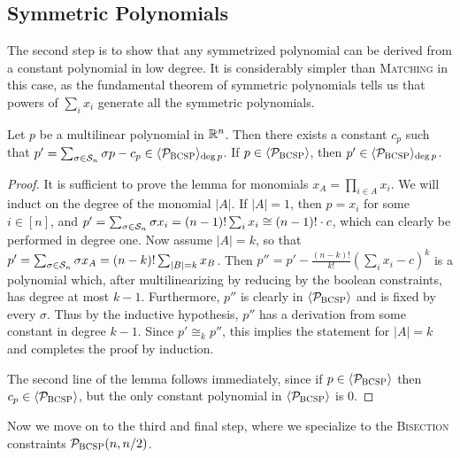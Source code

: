 \subsection{Symmetric Polynomials}
The second step is to show that any symmetrized polynomial can be derived from a constant polynomial in low degree. It is considerably simpler than \textsc{Matching} in this case, as the fundamental theorem of symmetric polynomials tells us that powers of $\sum_i x_i$ generate all the symmetric polynomials. 
\begin{lemma}\label{lem:bcsp-symmetric}
Let $p$ be a multilinear polynomial in $\mathbb R^n$. Then there exists a constant $c_p$ such that $p' = \sum_{\sigma \in \mathcal S_n} \sigma p - c_p \in \langle \mathcal P_{\textsc{BCSP}} \rangle_{\deg p}$. If $p \in \langle \mathcal P_{\textsc{BCSP}} \rangle$, then $p' \in \langle \mathcal P_{\textsc{BCSP}} \rangle_{\deg p}$.
\end{lemma}
\begin{proof}
It is sufficient to prove the lemma for monomials $x_A = \prod_{i \in A} x_i$. We will induct on the degree of the monomial $|A|$. 
If $|A| = 1$, then $p = x_i$ for some $i \in [n]$, and $p' = \sum_{\sigma \in \mathcal S_n} \sigma x_i = (n-1)!\sum_i x_i \cong (n-1)!\cdot c$, which can clearly be performed in degree one. Now assume $|A| = k$, so that $p' = \sum_{\sigma \in \mathcal S_n} \sigma x_A = (n-k)! \sum_{|B|=k} x_B$. Then $p'' = p' - \frac{(n-k)!}{k!}\left(\sum_i x_i - c\right)^k$ is a polynomial which, after multilinearizing by reducing by the boolean constraints, has degree at most $k-1$. Furthermore, $p''$ is clearly in $\langle \mathcal P_{\textsc{BCSP}} \rangle$ and is fixed by every $\sigma$. Thus by the inductive hypothesis, $p''$ has a derivation from some constant in degree $k-1$. Since $p' \cong_k p''$, this implies the statement for $|A| = k$ and completes the proof by induction.

The second line of the lemma follows immediately, since if $p \in \langle \mathcal P_{\textsc{BCSP}} \rangle$ then $c_p \in \langle \mathcal P_{\textsc{BCSP}} \rangle$, but the only constant polynomial in $\langle \mathcal P_{\textsc{BCSP}} \rangle$ is $0$.
\end{proof}
Now we move on to the third and final step, where we specialize to the \textsc{Bisection} constraints $\mathcal P_{\textsc{BCSP}}(n,n/2)$.

